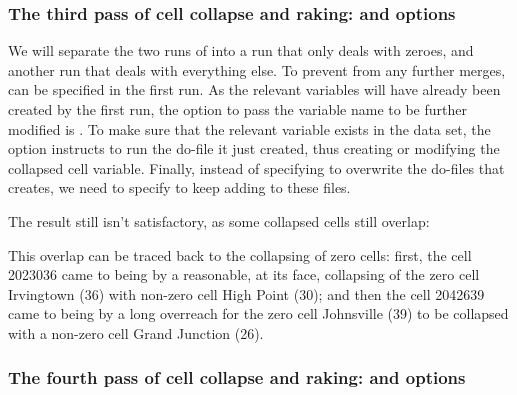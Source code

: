\subsubsection{The third pass of cell collapse and raking:  and  options}

We will separate the two runs of  into a run that only deals with zeroes,
and another run that deals with everything else. To prevent  from any further
merges,  can be specified in the first run. As the relevant variables will have already been
created by the first run, the option to pass the variable name to be further modified is
. To make sure that the relevant variable exists in the data set,
the option  instructs  to run the do-file it just created,
thus creating or modifying the collapsed cell variable.
Finally, instead of specifying  to overwrite the do-files that
 creates, we need to specify  to keep adding to these files.

\begin{stlog}
\nullskip
\end{stlog}

The result still isn't satisfactory, as some collapsed cells still overlap:

\begin{stlog}
\nullskip
\end{stlog}

This overlap can be traced back to the collapsing of zero cells:
first, the cell 2023036 came to being by a reasonable, at its face, collapsing
of the zero cell Irvingtown (36) with non-zero cell High Point (30);
and then the cell 2042639 came to being by a long overreach for the zero cell
Johnsville (39) to be collapsed with a non-zero cell Grand Junction (26).

\subsubsection{The fourth pass of cell collapse and raking:  and  options}

